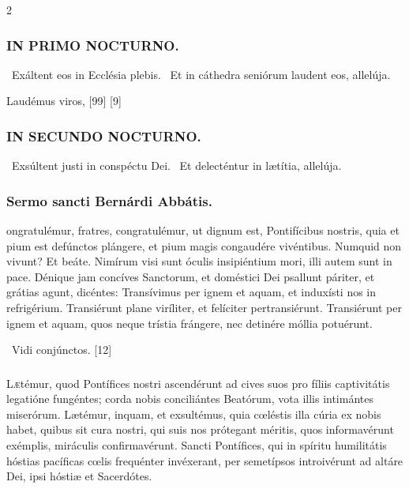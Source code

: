 \documentclass[9pt,twoside]{extarticle}
\begin{document}
\begin{multicols}{2}
\subsubsection*{\center \textsc{IN PRIMO NOCTURNO.}}
\begin{tightlist}{}
\item {}~Exáltent eos in Ecclésia plebis. ~Et in cáthedra seniórum laudent eos, allelúja.
\item {} Laudémus viros,  [99]  [9]
\end{tightlist}

\subsubsection*{\center \textsc{IN SECUNDO NOCTURNO.}}
\begin{tightlist}{}
\item {}~Exsúltent justi in conspéctu Dei. ~Et delecténtur in lætítia, allelúja.
\end{tightlist}

\subsubsection*{\center Sermo sancti Bernárdi Abbátis.}
\begin{center}\end{center}
ongratulémur, fratres, congratulémur, ut dignum est, Pontifícibus nostris, quia et pium est defúnctos plángere, et pium magis congaudére vivéntibus. Numquid non vivunt? Et beáte. Nimírum visi sunt óculis insipiéntium mori, illi autem sunt in pace. Dénique jam concíves Sanctorum, et doméstici Dei psallunt páriter, et grátias agunt, dicéntes: Transívimus per ignem et aquam, et induxísti nos in refrigérium. Transiérunt plane viríliter, et felíciter pertransiérunt. Transiérunt per ignem et aquam, quos neque trístia frángere, nec detinére móllia potuérunt.

\begin{tightlist}{}
\item {}~Vidi conjúnctos. [12]
\end{tightlist}

\subsubsection*{\center {}}
\lettrine{L}ætémur, quod Pontífices nostri ascendérunt ad cives suos pro fíliis captivitátis legatióne fungéntes; corda nobis conciliántes Beatórum, vota illis intimántes miserórum. Lætémur, inquam, et exsultémus, quia cœléstis illa cúria ex nobis habet, quibus sit cura nostri, qui suis nos prótegant méritis, quos informavérunt exémplis, miráculis confirmavérunt. Sancti Pontífices, qui in spíritu humilitátis hóstias pacíficas cœlis frequénter invéxerant, per semetípsos introivérunt ad altáre Dei, ipsi hóstiæ et Sacerdótes.


\end{multicols}
\end{document}

